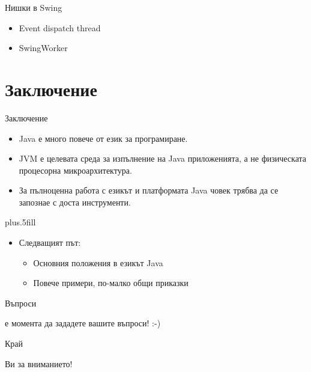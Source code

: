 \documentclass{beamer}
\begin{document}
\begin{frame}{Нишки в Swing}
  \transdissolve
  \begin{itemize}
  \item Event dispatch thread
  \item SwingWorker
  \end{itemize}
\end{frame}


\section*{Заключение}

\begin{frame}{Заключение}
  \transdissolve
  \begin{itemize}
  \item
    Java \alert{е много повече от език за програмиране}.
  \item
    JVM \alert{е целевата среда за изпълнение} на Java приложенията, а
    не физическата процесорна микроархитектура.
  \item
    За пълноценна работа с езикът и платформата Java човек трябва да
    се запознае с доста инструменти.
  \end{itemize}
  
  \vskip0pt plus.5fill
  \begin{itemize}
  \item
    Следващият път:
    \begin{itemize}
    \item
      Основния положения в езикът Java
    \item
      Повече примери, по-малко общи приказки
    \end{itemize}
  \end{itemize}
\end{frame}

\begin{frame}{Въпроси}
  \transdissolve
  \begin{center}
     е момента да зададете вашите въпроси! :-)
  \end{center}
\end{frame}

\begin{frame}{Край}
  \transdissolve
  \begin{center}
     Ви за вниманието!
  \end{center}
\end{frame}
\end{document}
